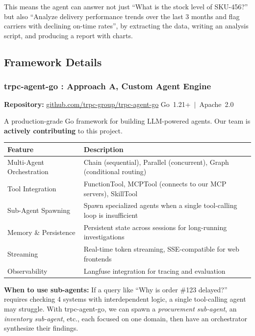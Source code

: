 \documentclass[11pt,a4paper]{article}
\begin{document}
This means the agent can answer not just ``What is the stock level of SKU-456?'' but also ``Analyze delivery performance trends over the last 3 months and flag carriers with declining on-time rates'', by extracting the data, writing an analysis script, and producing a report with charts.

\subsection{Framework Details}

\subsubsection{trpc-agent-go : Approach A, Custom Agent Engine}

\textbf{Repository:} \href{https://github.com/trpc-group/trpc-agent-go}{github.com/trpc-group/trpc-agent-go} \hfill Go~1.21+ $\,|\,$ Apache~2.0

\vspace{0.3em}
A production-grade Go framework for building LLM-powered agents. Our team is \textbf{actively contributing} to this project.

\begin{table}[H]
\centering\small
\begin{tabularx}{0.94\textwidth}{@{}l X@{}}
\toprule
\textbf{Feature} & \textbf{Description} \\
\midrule
Multi-Agent Orchestration & Chain (sequential), Parallel (concurrent), Graph (conditional routing) \\
Tool Integration          & FunctionTool, MCPTool (connects to our MCP servers), SkillTool \\
Sub-Agent Spawning        & Spawn specialized agents when a single tool-calling loop is insufficient \\
Memory \& Persistence     & Persistent state across sessions for long-running investigations \\
Streaming                 & Real-time token streaming, SSE-compatible for web frontends \\
Observability             & Langfuse integration for tracing and evaluation \\
\bottomrule
\end{tabularx}
\end{table}

\textbf{When to use sub-agents:} If a query like ``Why is order \#123 delayed?'' requires checking 4 systems with interdependent logic, a single tool-calling agent may struggle. With trpc-agent-go, we can spawn a \textit{procurement sub-agent}, an \textit{inventory sub-agent}, etc., each focused on one domain, then have an orchestrator synthesize their findings.
\end{document}
